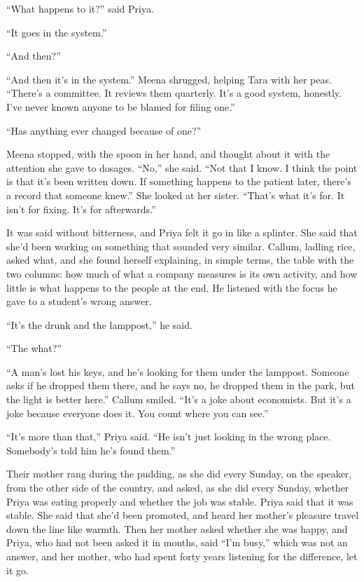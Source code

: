 ``What happens to it?'' said Priya.

``It goes in the system.''

``And then?''

``And then it's in the system.'' Meena shrugged, helping Tara with her peas. ``There's a committee. It reviews them quarterly. It's a good system, honestly. I've never known anyone to be blamed for filing one.''

``Has anything ever changed because of one?''

Meena stopped, with the spoon in her hand, and thought about it with the attention she gave to dosages. ``No,'' she said. ``Not that I know. I think the point is that it's been written down. If something happens to the patient later, there's a record that someone knew.'' She looked at her sister. ``That's what it's for. It isn't for fixing. It's for afterwards.''

It was said without bitterness, and Priya felt it go in like a splinter. She said that she'd been working on something that sounded very similar. Callum, ladling rice, asked what, and she found herself explaining, in simple terms, the table with the two columns: how much of what a company measures is its own activity, and how little is what happens to the people at the end. He listened with the focus he gave to a student's wrong answer.

``It's the drunk and the lamppost,'' he said.

``The what?''

``A man's lost his keys, and he's looking for them under the lamppost. Someone asks if he dropped them there, and he says no, he dropped them in the park, but the light is better here.'' Callum smiled. ``It's a joke about economists. But it's a joke because everyone does it. You count where you can see.''

``It's more than that,'' Priya said. ``He isn't just looking in the wrong place. Somebody's told him he's found them.''

Their mother rang during the pudding, as she did every Sunday, on the speaker, from the other side of the country, and asked, as she did every Sunday, whether Priya was eating properly and whether the job was stable. Priya said that it was stable. She said that she'd been promoted, and heard her mother's pleasure travel down the line like warmth. Then her mother asked whether she was happy, and Priya, who had not been asked it in months, said ``I'm busy,'' which was not an answer, and her mother, who had spent forty years listening for the difference, let it go.

